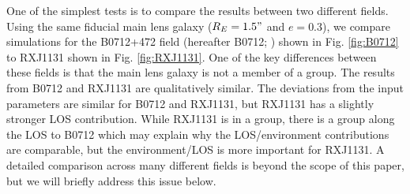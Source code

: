 One of the simplest tests is to compare the results between two different fields. Using the same fiducial main lens galaxy ($R_E = 1.5"$ and $e=0.3$), we compare simulations for the B0712+472 field (hereafter B0712; \citealt{Jackson98}) shown in Fig. \ref{fig:B0712} to RXJ1131 shown in Fig. \ref{fig:RXJ1131}. One of the key differences between these fields is that the main lens galaxy is not a member of a group. The results from B0712 and RXJ1131 are qualitatively similar. The deviations from the input parameters are similar for B0712 and RXJ1131, but RXJ1131 has a slightly stronger LOS contribution. While RXJ1131 is in a group, there is a group along the LOS to B0712 which may explain why the LOS/environment contributions are comparable, but the environment/LOS is more important for RXJ1131. A detailed comparison across many different fields is beyond the scope of this paper, but we will briefly address this issue below.
  